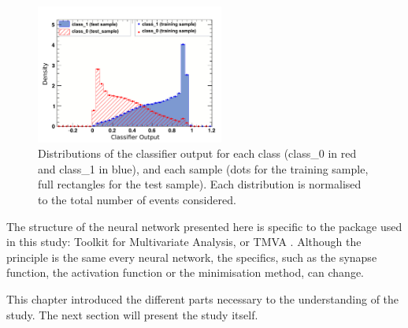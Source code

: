 \begin{figure}[h!]
    \centering
    \includegraphics[width=0.55\textwidth]{fig/NN_classifier.pdf}
    \caption{Distributions of the classifier output for each class (class\_0 in red and class\_1 in blue), and each sample (dots for the training sample, full rectangles for the test sample). Each distribution is normalised to the total number of events considered.}
    \label{fig:ALELUIA}
\end{figure}

The structure of the neural network presented here is specific to the package used in this study: Toolkit for Multivariate Analysis, or TMVA \citet{2007physics...3039H}. Although the principle is the same every neural network, the specifics, such as the synapse function, the activation function or the minimisation method, can change.

This chapter introduced the different parts necessary to the understanding of the study. The next section will present the study itself.